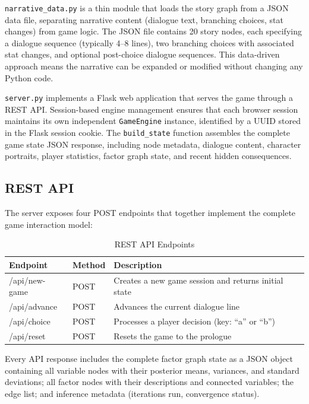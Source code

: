 \documentclass[journal]{IEEEtran}
\begin{document}
\texttt{narrative\_data.py} is a thin module that loads the story graph from a JSON data file, separating narrative content (dialogue text, branching choices, stat changes) from game logic. The JSON file contains 20 story nodes, each specifying a dialogue sequence (typically 4--8 lines), two branching choices with associated stat changes, and optional post-choice dialogue sequences. This data-driven approach means the narrative can be expanded or modified without changing any Python code.

\texttt{server.py} implements a Flask web application that serves the game through a REST API. Session-based engine management ensures that each browser session maintains its own independent \texttt{GameEngine} instance, identified by a UUID stored in the Flask session cookie. The \texttt{build\_state} function assembles the complete game state JSON response, including node metadata, dialogue content, character portraits, player statistics, factor graph state, and recent hidden consequences.

\subsection{REST API}

The server exposes four POST endpoints that together implement the complete game interaction model:

\begin{table}[!ht]
\centering
\caption{REST API Endpoints}
\label{tab:api}
\small
\setlength{\tabcolsep}{3pt}
\begin{tabular}{|l|l|l|}
\hline
\textbf{Endpoint} & \textbf{Method} & \textbf{Description} \\
\hline
/api/new-game & POST & Creates a new game session and returns initial state \\
\hline
/api/advance & POST & Advances the current dialogue line \\
\hline
/api/choice & POST & Processes a player decision (key: ``a'' or ``b'') \\
\hline
/api/reset & POST & Resets the game to the prologue \\
\hline
\end{tabular}
\vspace{-4pt}
\end{table}

Every API response includes the complete factor graph state as a JSON object containing all variable nodes with their posterior means, variances, and standard deviations; all factor nodes with their descriptions and connected variables; the edge list; and inference metadata (iterations run, convergence status).
\end{document}
